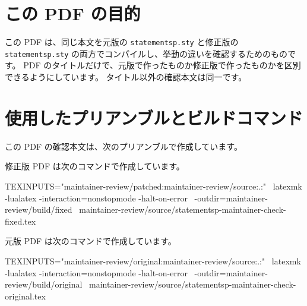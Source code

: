 \documentclass{ltjsarticle}
\title{\StatementspCheckTitle}
\author{statementsp 互換性・回帰確認}
\date{}
\begin{document}
\maketitle

\section{この PDF の目的}

この PDF は、同じ本文を元版の \texttt{statementsp.sty} と修正版の
\texttt{statementsp.sty} の両方でコンパイルし、挙動の違いを確認するためのものです。
PDF のタイトルだけで、元版で作ったものか修正版で作ったものかを区別できるようにしています。
タイトル以外の確認本文は同一です。

\section{使用したプリアンブルとビルドコマンド}

この PDF の確認本文は、次のプリアンブルで作成しています。


修正版 PDF は次のコマンドで作成しています。

\begin{codeblock}
TEXINPUTS="maintainer-review/patched:maintainer-review/source:.:" \
  latexmk -lualatex -interaction=nonstopmode -halt-on-error \
  -outdir=maintainer-review/build/fixed \
  maintainer-review/source/statementsp-maintainer-check-fixed.tex
\end{codeblock}

元版 PDF は次のコマンドで作成しています。

\begin{codeblock}
TEXINPUTS="maintainer-review/original:maintainer-review/source:.:" \
  latexmk -lualatex -interaction=nonstopmode -halt-on-error \
  -outdir=maintainer-review/build/original \
  maintainer-review/source/statementsp-maintainer-check-original.tex
\end{codeblock}
\end{document}
